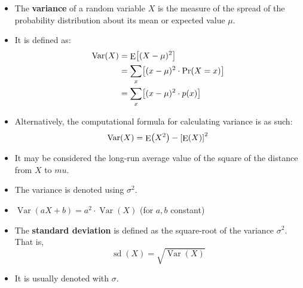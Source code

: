 \documentclass[12pt,a4paper,titlepage]{article}
\DeclareMathOperator{\E}{E}
\DeclareMathOperator{\Var}{Var}
\DeclareMathOperator{\sd}{sd}
\DeclarePairedDelimiter {\pars}  {  (      }     {  )      }
\DeclarePairedDelimiter {\bracs} {  [      }     {  ]      }
\begin{document}
\begin{SummaryBox}[title=Population parameters, breakable]
                \begin{SummaryExtensionBox}[title=Variance]
                    \begin{itemize}[leftmargin=*]
                        \item The \textbf{variance} of a random variable $X$ is the measure of the spread of the probability distribution about its mean or expected value $\mu$.
                        \item It is defined as:
                        \begin{align*}
                            \Var(X) &= \E\bracs*{ (X - \mu)^2 } \\
                                    &= \sum\limits_x \bracs*{ (x-\mu)^2 \cdot \Pr(X=x) } \\
                                    &= \sum\limits_x \bracs*{ (x-\mu)^2 \cdot p(x) }
                        \end{align*}
                        \item Alternatively, the computational formula for calculating variance is as such:
                        \[
                            \Var(X) = \E\pars*{X^2} - \bracs*{ \E(X) }^2
                        \]
                        \item It may be considered the long-run average value of the square of the distance from $X$ to $mu$.
                        \item The variance is denoted using $\sigma^2$.
                        \item $\Var(aX + b) = a^2 \cdot \Var(X)$ \quad (for $a,b$ constant)
                    \end{itemize}
                \end{SummaryExtensionBox}
                
                \begin{SummaryExtensionBox}[title=Standard deviation]
                    \begin{itemize}[leftmargin=*]
                        \item The \textbf{standard deviation} is defined as the square-root of the variance $\sigma^2$. That is,
                        \[
                            \sd(X) = \sqrt{\Var(X)}
                        \]
                        \item It is usually denoted with $\sigma$.
                    \end{itemize}
                \end{SummaryExtensionBox}
            \end{SummaryBox}
            
\end{document}

